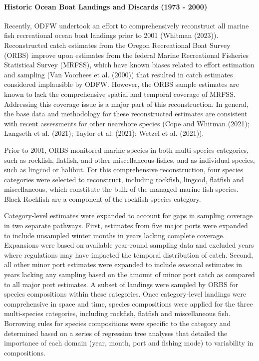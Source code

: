 \documentclass[11pt,
  english,
  letterpaper,
]{article}
\begin{document}
\hypertarget{historic-ocean-boat-landings-and-discards-1973---2000}{%
\paragraph{Historic Ocean Boat Landings and Discards (1973 - 2000)}\label{historic-ocean-boat-landings-and-discards-1973---2000}}

Recently, ODFW undertook an effort to comprehensively reconstruct all marine fish recreational ocean boat landings prior to 2001 (Whitman (2023)). Reconstructed catch estimates from the Oregon Recreational Boat Survey (ORBS) improve upon estimates from the federal Marine Recreational Fisheries Statistical Survey (MRFSS), which have known biases related to effort estimation and sampling (Van Voorhees et al. (2000)) that resulted in catch estimates considered implausible by ODFW. However, the ORBS sample estimates are known to lack the comprehensive spatial and temporal coverage of MRFSS. Addressing this coverage issue is a major part of this reconstruction. In general, the base data and methodology for these reconstructed estimates are consistent with recent assessments for other nearshore species (Cope and Whitman (2021); Langseth et al. (2021); Taylor et al. (2021); Wetzel et al. (2021)).

Prior to 2001, ORBS monitored marine species in both multi-species categories, such as rockfish, flatfish, and other miscellaneous fishes, and as individual species, such as lingcod or halibut. For this comprehensive reconstruction, four species categories were selected to reconstruct, including rockfish, lingcod, flatfish and miscellaneous, which constitute the bulk of the managed marine fish species. Black Rockfish are a component of the rockfish species category.

Category-level estimates were expanded to account for gaps in sampling coverage in two separate pathways. First, estimates from five major ports were expanded to include unsampled winter months in years lacking complete coverage. Expansions were based on available year-round sampling data and excluded years where regulations may have impacted the temporal distribution of catch. Second, all other minor port estimates were expanded to include seasonal estimates in years lacking any sampling based on the amount of minor port catch as compared to all major port estimates. A subset of landings were sampled by ORBS for species compositions within these categories. Once category-level landings were comprehensive in space and time, species compositions were applied for the three multi-species categories, including rockfish, flatfish and miscellaneous fish. Borrowing rules for species compositions were specific to the category and determined based on a series of regression tree analyses that detailed the importance of each domain (year, month, port and fishing mode) to variability in compositions.
\end{document}
